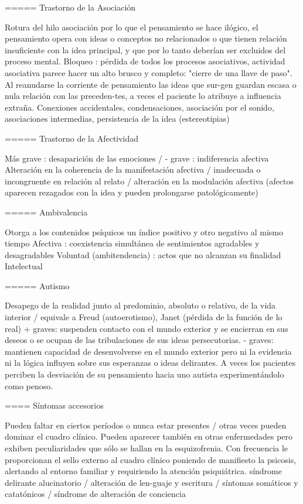 \documentclass{scrbook}
\begin{document}
===== Trastorno de la Asociación

Rotura del hilo asociación por lo que el pensamiento se hace ilógico, el pensamiento opera con ideas o conceptos no relacionados o que tienen relación insuficiente con la idea principal, y que por lo tanto deberían ser excluidos del proceso mental. Bloqueo : pérdida de todos los procesos asociativos, actividad asociativa parece hacer un alto brusco y completo: "cierre de una llave de paso". Al reanudarse la corriente de pensamiento las ideas que sur-gen guardan escasa o nula relación con las preceden-tes, a veces el paciente lo atribuye a influencia extraña. Conexiones accidentales, condensaciones, asociación por el sonido, asociaciones intermedias, persistencia de la idea (estereotipias)

===== Trastorno de la Afectividad

Más grave : desaparición de las emociones / - grave : indiferencia afectiva Alteración en la coherencia de la manifestación afectiva / inadecuada o incongruente en relación al relato / alteración en la modulación afectiva (afectos aparecen rezagados con la idea y pueden prolongarse patológicamente)

===== Ambivalencia

Otorga a los contenidos psíquicos un índice positivo y otro negativo al mismo tiempo Afectiva : coexistencia simultánea de sentimientos agradables y desagradables Voluntad (ambitendencia) : actos que no alcanzan su finalidad Intelectual

===== Autismo

Desapego de la realidad junto al predominio, absoluto o relativo, de la vida interior / equivale a Freud (autoerotismo), Janet (pérdida de la función de lo real) + graves: suspenden contacto con el mundo exterior y se encierran en sus deseos o se ocupan de las tribulaciones de sus ideas persecutorias. - graves: mantienen capacidad de desenvolverse en el mundo exterior pero ni la evidencia ni la lógica influyen sobre sus esperanzas o ideas delirantes. A veces los pacientes perciben la desviación de su pensamiento hacia uno autista experimentándolo como penoso.

==== Síntomas accesorios

Pueden faltar en ciertos períodos o nunca estar presentes / otras veces pueden dominar el cuadro clínico. Pueden aparecer también en otras enfermedades pero exhiben peculiaridades que sólo se hallan en la esquizofrenia. Con frecuencia le proporcionan el sello externo al cuadro clínico poniendo de manifiesto la psicosis, alertando al entorno familiar y requiriendo la atención psiquiátrica. síndrome delirante alucinatorio / alteración de len-guaje y escritura / síntomas somáticos y catatónicos / síndrome de alteración de conciencia
\end{document}
